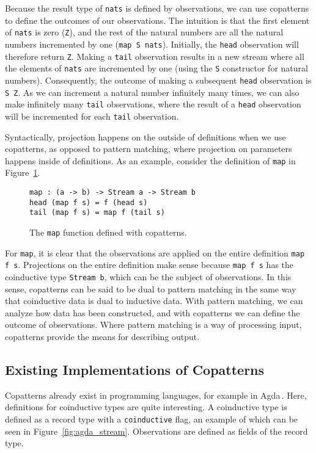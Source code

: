 Because the result type of \texttt{nats} is defined by observations, we can use
copatterns to define the outcomes of our observations. The intuition is that the
first element of \texttt{nats} is zero (\texttt{Z}), and the rest of the natural
numbers are all the natural numbers incremented by one (\texttt{map S
  nats}). Initially, the \texttt{head} observation will therefore return
\texttt{Z}. Making a \texttt{tail} observation results in a new stream where all
the elements of \texttt{nats} are incremented by one (using the \texttt{S}
constructor for natural numbers). Consequently, the outcome of making a
subsequent \texttt{head} observation is \texttt{S Z}. As we can increment a
natural number infinitely many times, we can also make infinitely many
\texttt{tail} observations, where the result of a \texttt{head} observation will
be incremented for each \texttt{tail} observation. 


Syntactically, projection happens on the outside of definitions when we use
copatterns, as opposed to pattern matching, where projection on parameters
happens inside of definitions. As an example, consider the definition of
\texttt{map} in Figure~\ref{fig:map_copatterns}.


\begin{figure}[h]
\begin{lstlisting}[mathescape]
map : (a -> b) -> Stream a -> Stream b
head (map f s) = f (head s)
tail (map f s) = map f (tail s)
\end{lstlisting}
\caption{The \texttt{map} function defined with copatterns.}
\label{fig:map_copatterns}
\end{figure}

For \texttt{map}, it is clear that the observations are applied on the entire
definition \texttt{map f s}. Projections on the entire definition make sense
because \texttt{map f s} has the coinductive type \texttt{Stream b}, which can
be the subject of observations. In this sense, copatterns can be said to be dual
to pattern matching in the same way that coinductive data is dual to inductive
data. With pattern matching, we can analyze how data has been constructed, and
with copatterns we can define the outcome of observations. Where pattern
matching is a way of processing input, copatterns provide the means for
describing output. 

\subsection{Existing Implementations of Copatterns}
Copatterns already exist in programming languages, for example in
Agda\,\cite{Norell:thesis}. Here, definitions for coinductive types are quite
interesting. A coinductive type is defined as a record type with a
\texttt{coinductive} flag, an example of which can be seen in
Figure~\ref{fig:agda_stream}. Observations are defined as fields of the record
type.

